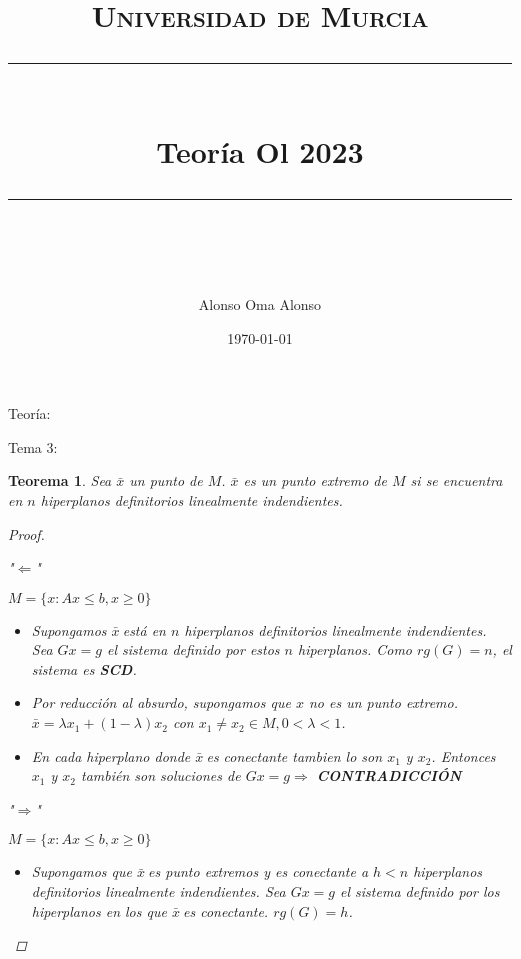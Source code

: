 \documentclass{article}
\title{	

	\normalfont\normalsize
	\textsc{Universidad de Murcia}\\ 
	\vspace{25pt} %
	\rule{\linewidth}{0.5pt} %
	\vspace{20pt}\\ %
	{\huge Teoría Ol 2023
}\\ %
	\vspace{12pt} %
	\rule{\linewidth}{2pt}\\ %
	\vspace{12pt} %
}
\author{\LARGE Alonso Oma Alonso} %
\date{\normalsize\today} %
\newcommand{\bx}{$\bar x \ $}
\newtheorem*{theorem*}{Teorema}
\begin{document}
\begin{titlepage}
	\maketitle
\end{titlepage}

\newpage
\tableofcontents
\newpage

\begin{section}{Teoría:}

	\begin{subsection}{Tema 3:}
		
        \begin{theorem*}{3.3}

            Sea $\bar x$ un punto de $M$. $\bar x$ es un punto extremo de $M$
            si se encuentra en $n$ hiperplanos definitorios linealmente indendientes.

            \begin{proof}
                \
                
                "$\Longleftarrow $" 
                
                $M = \{x: Ax \leq b, x\geq 0\}$
                \begin{itemize}
                    \item Supongamos \bx está en $n$ hiperplanos definitorios linealmente indendientes.
                    Sea $Gx = g$ el sistema definido por estos $n$ hiperplanos. Como $rg(G)=n$, el sistema es
                    \textbf{SCD}.
                    \item Por reducción al absurdo, supongamos que $x$ no es un punto extremo. $\bar x = \lambda x_1 + (1-\lambda)x_2$
                    con $x_1 \neq x_2 \in M, 0 < \lambda <1$.
                    \item En cada hiperplano donde \bx es conectante tambien lo son $x_1$ y $x_2$. Entonces $x_1$ y $x_2$ también son
                    soluciones de $Gx = g \Longrightarrow$ \textbf{CONTRADICCIÓN}
                \end{itemize}

                "$\Longrightarrow$"

                $M = \{x: Ax \leq b, x\geq 0\}$
                \begin{itemize}
                    \item Supongamos que \bx es punto extremos y es conectante a $h<n$ hiperplanos definitorios linealmente indendientes.
                    Sea $Gx=g$ el sistema definido por los hiperplanos en los que \bx es conectante. $rg(G) = h$.


\end{itemize}
\end{proof}
\end{theorem*}
\end{subsection}
\end{section}
\end{document}

